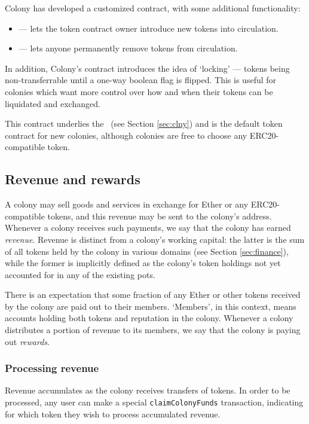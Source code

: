 Colony has developed a customized  contract, with some additional functionality:

\begin{itemize}
	\item {} --- lets the token contract owner introduce new tokens into circulation.
	\item {} --- lets anyone permanently remove tokens from circulation.
\end{itemize}

In addition, Colony's  contract introduces the idea of `locking' --- tokens being non-transferrable until a one-way boolean flag is flipped. This is useful for colonies which want more control over how and when their tokens can be liquidated and exchanged.

This contract underlies the \rct\ (see Section \ref{sec:clny}) and is the default token contract for new colonies, although colonies are free to choose any ERC20-compatible token.

\subsection{Revenue and rewards}\label{sec:revenue}

A colony may sell goods and services in exchange for Ether or any ERC20-compatible tokens, and this revenue may be sent to the colony's address. Whenever a colony receives such payments, we say that the colony has earned \emph{revenue}. Revenue is distinct from a colony's working capital: the latter is the sum of all tokens held by the colony in various domains (see Section \ref{sec:finance}), while the former is implicitly defined as the colony's token holdings not yet accounted for in any of the existing pots.

There is an expectation that some fraction of any Ether or other tokens received by the colony are paid out to their members. `Members', in this context, means accounts holding both tokens and reputation in the colony. Whenever a colony distributes a portion of revenue to its members, we say that the colony is paying out \emph{rewards}.

\subsubsection{Processing revenue}

Revenue accumulates as the colony receives transfers of tokens. In order to be processed, any user can make a special \texttt{claimColonyFunds} transaction, indicating for which token they wish to process accumulated revenue.


